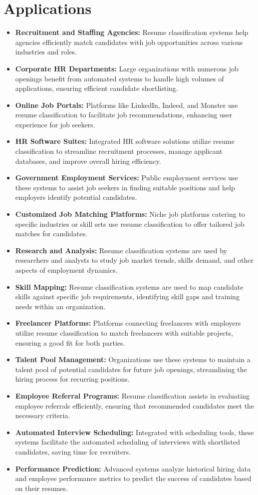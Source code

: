 \section{Applications}
\begin{itemize}
	\item \textbf{Recruitment and Staffing Agencies:} Resume classification systems help agencies efficiently match candidates with job opportunities across various industries and roles.
	\item \textbf{Corporate HR Departments:} Large organizations with numerous job openings benefit from automated systems to handle high volumes of applications, ensuring efficient candidate shortlisting.
	\item \textbf{Online Job Portals:} Platforms like LinkedIn, Indeed, and Monster use resume classification to facilitate job recommendations, enhancing user experience for job seekers.
	\item \textbf{HR Software Suites:} Integrated HR software solutions utilize resume classification to streamline recruitment processes, manage applicant databases, and improve overall hiring efficiency.
	\item \textbf{Government Employment Services:} Public employment services use these systems to assist job seekers in finding suitable positions and help employers identify potential candidates.
	\item \textbf{Customized Job Matching Platforms:} Niche job platforms catering to specific industries or skill sets use resume classification to offer tailored job matches for candidates.
	\item \textbf{Research and Analysis:} Resume classification systems are used by researchers and analysts to study job market trends, skills demand, and other aspects of employment dynamics.
	\item \textbf{Skill Mapping:} Resume classification systems are used to map candidate skills against specific job requirements, identifying skill gaps and training needs within an organization.
	\item \textbf{Freelancer Platforms:} Platforms connecting freelancers with employers utilize resume classification to match freelancers with suitable projects, ensuring a good fit for both parties.
	\item \textbf{Talent Pool Management:} Organizations use these systems to maintain a talent pool of potential candidates for future job openings, streamlining the hiring process for recurring positions.
	\item \textbf{Employee Referral Programs:} Resume classification assists in evaluating employee referrals efficiently, ensuring that recommended candidates meet the necessary criteria.
	\item \textbf{Automated Interview Scheduling:} Integrated with scheduling tools, these systems facilitate the automated scheduling of interviews with shortlisted candidates, saving time for recruiters.
	\item \textbf{Performance Prediction:} Advanced systems analyze historical hiring data and employee performance metrics to predict the success of candidates based on their resumes.
\end{itemize}
